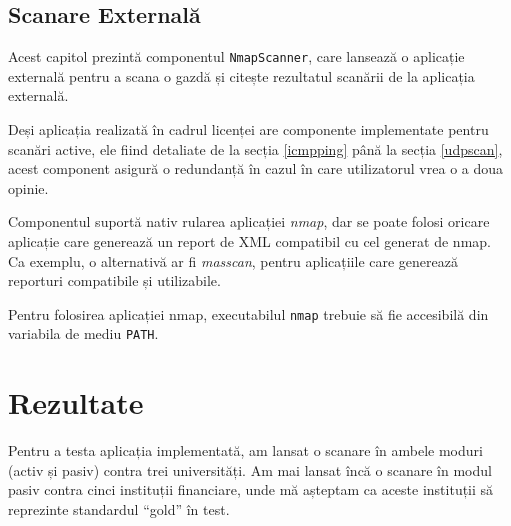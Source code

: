 \subsection*{Scanare Externală}

	Acest capitol prezintă componentul \texttt{NmapScanner}, care lansează o aplicație externală pentru a scana o gazdă și citește rezultatul scanării de la aplicația externală.
	
	Deși aplicația realizată în cadrul licenței are componente implementate pentru scanări active, ele fiind detaliate de la secția \ref{icmpping} până la secția \ref{udpscan}, acest component asigură o redundanță în cazul în care utilizatorul vrea o a doua opinie.
	
	Componentul suportă nativ rularea aplicației \textit{nmap}, dar se poate folosi oricare aplicație care generează un report de XML compatibil cu cel generat de nmap. Ca exemplu, o alternativă ar fi \textit{masscan}, pentru aplicațiile care generează reporturi compatibile și utilizabile.
	
	Pentru folosirea aplicației nmap, executabilul \texttt{nmap} trebuie să fie accesibilă din variabila de mediu \texttt{PATH}.

\section*{Rezultate}

	Pentru a testa aplicația implementată, am lansat o scanare în ambele moduri (activ și pasiv) contra trei universități. Am mai lansat încă o scanare în modul pasiv contra cinci instituții financiare, unde mă așteptam ca aceste instituții să reprezinte standardul ``gold'' în test.

